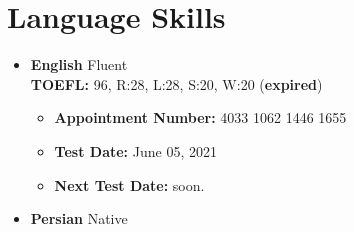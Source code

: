 \documentclass[10pt,a4paper,times]{moderncv}
\begin{document}


\section{Language Skills}
\begin{itemize}
	\item \textbf{English} \hspace{6 pt} Fluent
	\\\textbf{ \hspace{3 pt} TOEFL:}  96, R:28, L:28, S:20, W:20 (\textbf{expired})
	\begin{itemize}
	\item \textbf{ \hspace{6 pt} Appointment Number:}  4033 1062 1446 1655
	\item \textbf{ \hspace{6 pt} Test Date: }  June 05, 2021
	\item \textbf{Next Test Date:} soon.
	\end{itemize} 
	\item \textbf{Persian} \hspace{5 pt} Native
\end{itemize} 
\end{document}
